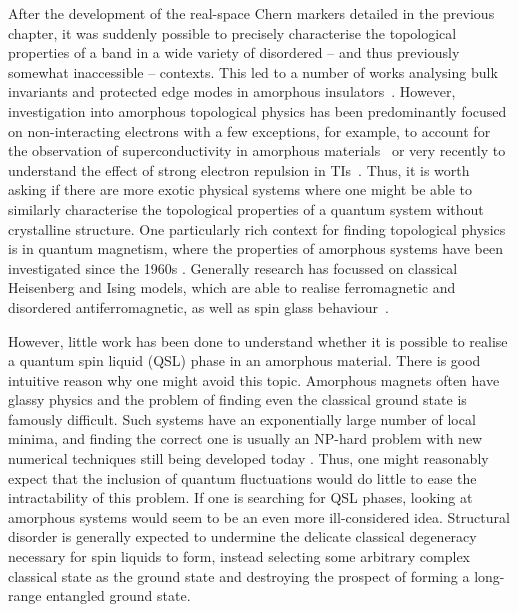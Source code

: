 After the development of the real-space Chern markers detailed in the previous chapter, it was suddenly possible to precisely characterise the topological properties of a band in a wide variety of disordered -- and thus previously somewhat inaccessible -- contexts. This led to a number of works analysing bulk invariants and protected edge modes in amorphous insulators~\cite{mitchell_amorphous_2018,agarwala_higher-order_2020,marsal_topological_2020,costa_toward_2019,agarwala_higher-order_2020,spring_amorphous_2021,corbae_evidence_2019}. However, investigation into amorphous topological physics has been predominantly focused on non-interacting electrons with a few exceptions, for example, to account for the observation of superconductivity in amorphous materials~\cite{buckel_einflus_1954,mcmillan_electron_1981,meisel_eliashberg_1981,bergmann_amorphous_1976,manna_noncrystalline_2022} or very recently to understand the effect of strong electron repulsion in TIs~\cite{kim_fractionalization_2023}. Thus, it is worth asking if there are more exotic physical systems where one might be able to similarly characterise the topological properties of a quantum system without crystalline structure. 
One particularly rich context for finding topological physics is in quantum magnetism, where the properties of amorphous systems have been investigated since the 1960s \cite{aharony_critical_1975,petrakovskii_amorphous_1981,fahnle_monte_1984, kaneyoshi_introduction_1992,plascak_ising_2000,kaneyoshi_amorphous_2018}. Generally research has focussed on classical Heisenberg and Ising models, which are able to realise ferromagnetic and disordered antiferromagnetic, as well as spin glass behaviour~\cite{edwards_theory_1975,coey_amorphous_1978,binder_spin_1986}. 

However, little work has been done to understand whether it is possible to realise a quantum spin liquid (QSL) phase in an amorphous material. There is good intuitive reason why one might avoid this topic. Amorphous magnets often have glassy physics and the problem of finding even the classical ground state is famously difficult. Such systems have an exponentially large number of local minima, and finding the correct one is usually an NP-hard problem \cite{barahona_computational_1982} with new numerical techniques still being developed today \cite{roma_ground_2009,wang_comparing_2015,fan_searching_2023}. Thus, one might reasonably expect that the inclusion of quantum fluctuations would do little to ease the intractability of this problem. If one is searching for QSL phases, looking at amorphous systems would seem to be an even more ill-considered idea. Structural disorder is generally expected to undermine the delicate classical degeneracy necessary for spin liquids to form, instead selecting some arbitrary complex classical state as the ground state and destroying the prospect of forming a long-range entangled ground state.


